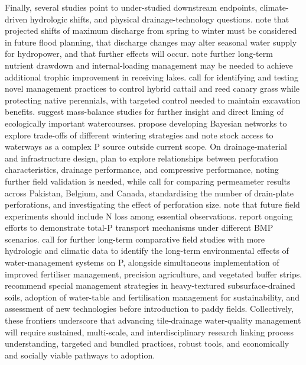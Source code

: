 \documentclass[11pt]{article}
\begin{document}
Finally, several studies point to under-studied downstream endpoints, climate-driven hydrologic shifts, and physical drainage-technology questions. \textcite{Apsite2017} note that projected shifts of maximum discharge from spring to winter must be considered in future flood planning, that discharge changes may alter seasonal water supply for hydropower, and that further effects will occur. \textcite{Husk2024} note further long-term nutrient drawdown and internal-loading management may be needed to achieve additional trophic improvement in receiving lakes. \textcite{Winikoff2020} call for identifying and testing novel management practices to control hybrid cattail and reed canary grass while protecting native perennials, with targeted control needed to maintain excavation benefits. \textcite{PALKO1994} suggest mass-balance studies for further insight and direct liming of ecologically important watercourses. \textcite{Lucci2014} propose developing Bayesian networks to explore trade-offs of different wintering strategies and note stock access to waterways as a complex P source outside current scope. On drainage-material and infrastructure design, \textcite{Zhang2025b} plan to explore relationships between perforation characteristics, drainage performance, and compressive performance, noting further field validation is needed, while \textcite{ASGHAR1995} call for comparing permeameter results across Pakistan, Belgium, and Canada, standardising the number of drain-plate perforations, and investigating the effect of perforation size. \textcite{Zhang2022b} note that future field experiments should include N loss among essential observations. \textcite{Eastman2010} report ongoing efforts to demonstrate total-P transport mechanisms under different BMP scenarios. \textcite{Grenon2023} call for further long-term comparative field studies with more hydrologic and climatic data to identify the long-term environmental effects of water-management systems on P, alongside simultaneous implementation of improved fertiliser management, precision agriculture, and vegetated buffer strips. \textcite{Hashemi2020} recommend special management strategies in heavy-textured subsurface-drained soils, adoption of water-table and fertilisation management for sustainability, and assessment of new technologies before introduction to paddy fields. Collectively, these frontiers underscore that advancing tile-drainage water-quality management will require sustained, multi-scale, and interdisciplinary research linking process understanding, targeted and bundled practices, robust tools, and economically and socially viable pathways to adoption.

\printbibliography
\end{document}
